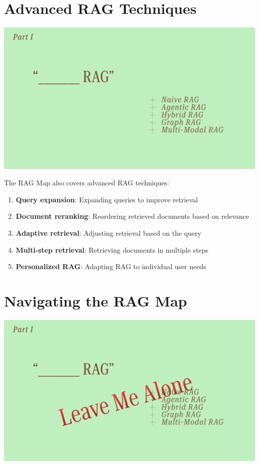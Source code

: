 \documentclass[
  letterpaper,
  oneside]{scrbook}
\providecommand{\tightlist}{%
  \setlength{\itemsep}{0pt}\setlength{\parskip}{0pt}}\usepackage{longtable,booktabs,array}
\begin{document}
\section{Advanced RAG Techniques}\label{advanced-rag-techniques}

\includegraphics{chapters/../p5-images/slide_7.png}

The RAG Map also covers advanced RAG techniques:

\begin{enumerate}
\def\labelenumi{\arabic{enumi}.}
\tightlist
\item
  \textbf{Query expansion}: Expanding queries to improve retrieval
\item
  \textbf{Document reranking}: Reordering retrieved documents based on
  relevance
\item
  \textbf{Adaptive retrieval}: Adjusting retrieval based on the query
\item
  \textbf{Multi-step retrieval}: Retrieving documents in multiple steps
\item
  \textbf{Personalized RAG}: Adapting RAG to individual user needs
\end{enumerate}

\section{Navigating the RAG Map}\label{navigating-the-rag-map}

\includegraphics{chapters/../p5-images/slide_8.png}
\end{document}
